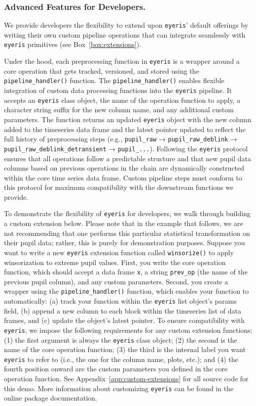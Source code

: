\subsubsection{Advanced Features for Developers.}\label{sec:dev-features}
We provide developers the flexibility to extend upon \texttt{eyeris}’ default offerings by writing their own custom pipeline operations that can integrate seamlessly with \texttt{eyeris} primitives (see Box~\ref{box:extensions}).

Under the hood, each preprocessing function in \texttt{eyeris} is a wrapper around a core operation that gets tracked, versioned, and stored using the \texttt{pipeline\_handler()} function. The \texttt{pipeline\_handler()} enables flexible integration of custom data processing functions into the \texttt{eyeris} pipeline. It accepts an \texttt{eyeris} class object, the name of the operation function to apply, a character string suffix for the new column name, and any additional custom parameters. The function returns an updated \texttt{eyeris} object with the new column added to the timeseries data frame and the latest pointer updated to reflect the full history of preprocessing steps (e.g., \texttt{pupil\_raw} → \texttt{pupil\_raw\_deblink} → \texttt{pupil\_raw\_deblink\_detransient} → \texttt{pupil\_...}). Following the \texttt{eyeris} protocol ensures that all operations follow a predictable structure and that new pupil data columns based on previous operations in the chain are dynamically constructed within the core time series data frame. Custom pipeline steps must conform to this protocol for maximum compatibility with the downstream functions we provide.

To demonstrate the flexibility of \texttt{eyeris} for developers, we walk through building a custom extension below. Please note that in the example that follows, we are not recommending that one performs this particular statistical transformation on their pupil data; rather, this is purely for demonstration purposes. Suppose you want to write a new \texttt{eyeris} extension function called \texttt{winsorize()} to apply winsorization to extreme pupil values. First, you write the core operation function, which should accept a data frame \texttt{x}, a string \texttt{prev\_op} (the name of the previous pupil column), and any custom parameters. Second, you create a wrapper using the \texttt{pipeline\_handler()} function, which enables your function to automatically: (a) track your function within the \texttt{eyeris} list object’s params field, (b) append a new column to each block within the timeseries list of data frames, and (c) update the object’s latest pointer. To ensure compatibility with \texttt{eyeris}, we impose the following requirements for any custom extension functions: (1) the first argument is always the \texttt{eyeris} class object; (2) the second is the name of the core operation function; (3) the third is the internal label you want \texttt{eyeris} to refer to (i.e., the one for the column name, plots, etc.); and (4) the fourth position onward are the custom parameters you defined in the core operation function. See Appendix~\ref{app:custom-extensions} for all source code for this demo. More information about customizing \texttt{eyeris} can be found in the online package documentation.

